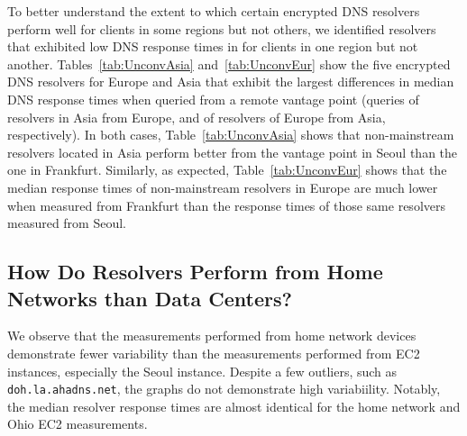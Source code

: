 To better understand the extent to which certain encrypted DNS resolvers
perform well for clients in some regions but not others, we identified
resolvers that exhibited low DNS response times in for clients in one region
but not another. 
Tables~\ref{tab:UnconvAsia} and~\ref{tab:UnconvEur} show 
the five encrypted DNS resolvers for Europe and Asia that exhibit the 
largest differences in median DNS response times when
queried from a remote vantage point (queries of resolvers in Asia from Europe,
and of resolvers of Europe from Asia, respectively). In both cases, 
Table~\ref{tab:UnconvAsia} shows that non-mainstream resolvers located
in Asia perform better from the vantage point in Seoul than the one in
Frankfurt.  Similarly, as expected, Table~\ref{tab:UnconvEur} shows that the
median response times of non-mainstream resolvers in Europe are much lower when
measured from Frankfurt than the response times of those same resolvers
measured from Seoul.

\subsection{How Do Resolvers Perform from Home Networks than Data Centers?}

We observe that the measurements performed from home network devices 
demonstrate fewer variability than the measurements performed from EC2 instances, 
especially the Seoul instance. Despite a few outliers, such as \texttt{doh.la.ahadns.net}, 
the graphs do not demonstrate high variabiility. Notably, the median resolver response 
times are almost identical for the home network and Ohio EC2 measurements. 

